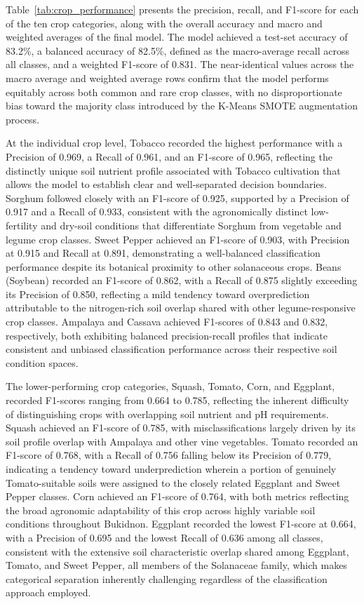 {	Table~\ref{tab:crop_performance} presents the precision, recall, and F1-score for each of the ten crop categories, along with the overall accuracy and macro and weighted averages of the final model. The model achieved a test-set accuracy of 83.2\%, a balanced accuracy of 82.5\%, defined as the macro-average recall across all classes, and a weighted F1-score of 0.831. The near-identical values across the macro average and weighted average rows confirm that the model performs equitably across both common and rare crop classes, with no disproportionate bias toward the majority class introduced by the K-Means SMOTE augmentation process.
	
	At the individual crop level, Tobacco recorded the highest performance with a Precision of 0.969, a Recall of 0.961, and an F1-score of 0.965, reflecting the distinctly unique soil nutrient profile associated with Tobacco cultivation that allows the model to establish clear and well-separated decision boundaries. Sorghum followed closely with an F1-score of 0.925, supported by a Precision of 0.917 and a Recall of 0.933, consistent with the agronomically distinct low-fertility and dry-soil conditions that differentiate Sorghum from vegetable and legume crop classes. Sweet Pepper achieved an F1-score of 0.903, with Precision at 0.915 and Recall at 0.891, demonstrating a well-balanced classification performance despite its botanical proximity to other solanaceous crops. Beans (Soybean) recorded an F1-score of 0.862, with a Recall of 0.875 slightly exceeding its Precision of 0.850, reflecting a mild tendency toward overprediction attributable to the nitrogen-rich soil overlap shared with other legume-responsive crop classes. Ampalaya and Cassava achieved F1-scores of 0.843 and 0.832, respectively, both exhibiting balanced precision-recall profiles that indicate consistent and unbiased classification performance across their respective soil condition spaces.
	
	The lower-performing crop categories, Squash, Tomato, Corn, and Eggplant, recorded F1-scores ranging from 0.664 to 0.785, reflecting the inherent difficulty of distinguishing crops with overlapping soil nutrient and pH requirements. Squash achieved an F1-score of 0.785, with misclassifications largely driven by its soil profile overlap with Ampalaya and other vine vegetables. Tomato recorded an F1-score of 0.768, with a Recall of 0.756 falling below its Precision of 0.779, indicating a tendency toward underprediction wherein a portion of genuinely Tomato-suitable soils were assigned to the closely related Eggplant and Sweet Pepper classes. Corn achieved an F1-score of 0.764, with both metrics reflecting the broad agronomic adaptability of this crop across highly variable soil conditions throughout Bukidnon. Eggplant recorded the lowest F1-score at 0.664, with a Precision of 0.695 and the lowest Recall of 0.636 among all classes, consistent with the extensive soil characteristic overlap shared among Eggplant, Tomato, and Sweet Pepper, all members of the Solanaceae family, which makes categorical separation inherently challenging regardless of the classification approach employed.
	
}
